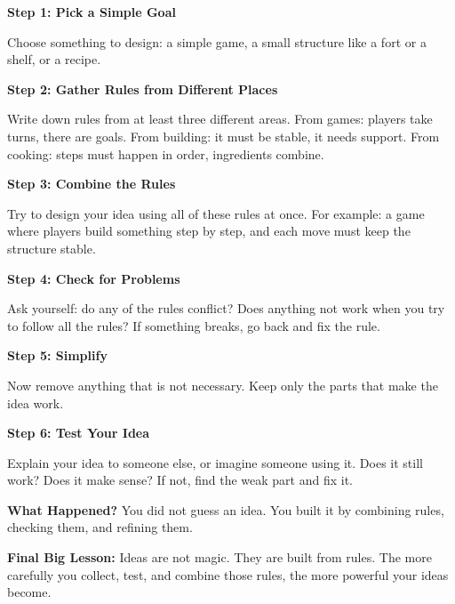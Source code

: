 \documentclass[12pt]{book}
\begin{document}
\textbf{Step 1: Pick a Simple Goal}

Choose something to design: a simple game, a small structure like a fort
or a shelf, or a recipe.

\textbf{Step 2: Gather Rules from Different Places}

Write down rules from at least three different areas. From games: players
take turns, there are goals. From building: it must be stable, it needs
support. From cooking: steps must happen in order, ingredients combine.

\textbf{Step 3: Combine the Rules}

Try to design your idea using all of these rules at once. For example:
a game where players build something step by step, and each move must
keep the structure stable.

\textbf{Step 4: Check for Problems}

Ask yourself: do any of the rules conflict? Does anything not work when
you try to follow all the rules? If something breaks, go back and fix
the rule.

\textbf{Step 5: Simplify}

Now remove anything that is not necessary. Keep only the parts that make
the idea work.

\textbf{Step 6: Test Your Idea}

Explain your idea to someone else, or imagine someone using it. Does it
still work? Does it make sense? If not, find the weak part and fix it.

\textbf{What Happened?} You did not guess an idea. You built it by combining
rules, checking them, and refining them.

\textbf{Final Big Lesson:} Ideas are not magic. They are built from rules.
The more carefully you collect, test, and combine those rules, the more
powerful your ideas become.


\backmatter

\printindex[keywords]

\printindex[words]
\end{document}
